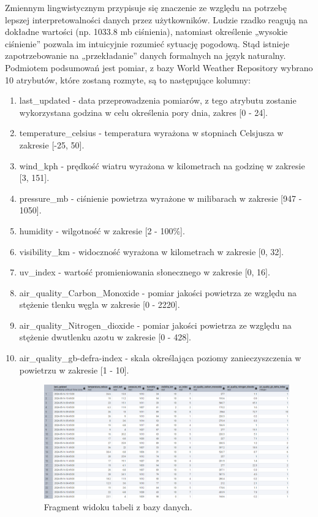 \documentclass{article}
\begin{document}
Zmiennym lingwistycznym przypisuje się znaczenie ze względu na potrzebę lepszej interpretowalności danych przez użytkowników. Ludzie rzadko reagują na dokładne wartości (np. 1033.8 mb ciśnienia), natomiast określenie „wysokie ciśnienie” pozwala im intuicyjnie rozumieć sytuację pogodową. Stąd istnieje zapotrzebowanie na „przekładanie” danych formalnych na język naturalny. 
Podmiotem podsumowań jest pomiar, z bazy World Weather Repository wybrano 10 atrybutów, które zostaną rozmyte, są to następujące kolumny:
\begin{enumerate}
    \item last\_updated - data przeprowadzenia pomiarów, z tego atrybutu zostanie wykorzystana godzina w celu określenia pory dnia, zakres [0 - 24]. 
    \item temperature\_celsius - temperatura wyrażona w stopniach Celsjusza w zakresie [-25, 50].
    \item wind\_kph - prędkość wiatru wyrażona w kilometrach na godzinę w zakresie [3, 151]. 
    \item pressure\_mb - ciśnienie powietrza wyrażone w milibarach w zakresie [947 - 1050]. 
    \item humidity - wilgotność w zakresie [2 - 100\%].
    \item visibility\_km - widoczność wyrażona w kilometrach w zakresie [0, 32].
    \item uv\_index - wartość promieniowania słonecznego w zakresie [0, 16].
    \item air\_quality\_Carbon\_Monoxide - pomiar jakości powietrza ze względu na stężenie tlenku węgla w zakresie [0 - 2220].
    \item air\_quality\_Nitrogen\_dioxide - pomiar jakości powietrza ze względu na stężenie dwutlenku azotu w zakresie [0 - 428].
    \item air\_quality\_gb-defra-index - skala określająca poziomy zanieczyszczenia w powietrzu w zakresie [1 - 10].

    \begin{figure}[h!]
    \centering
    \includegraphics[width=\textwidth]{img/table.png}
    \caption{Fragment widoku tabeli z bazy danych.}
    \end{figure}
    
\end{enumerate}
\end{document}
